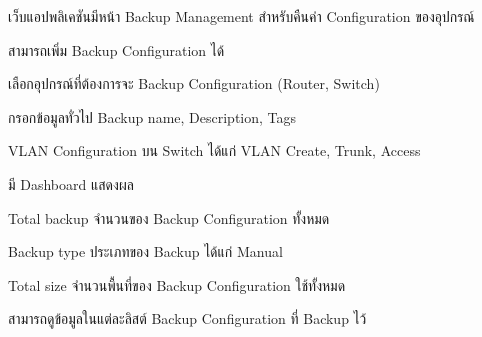 \begin{mycustomenum2}
    \item เว็บแอปพลิเคชันมีหน้า Backup Management สำหรับคืนค่า Configuration ของอุปกรณ์
    \begin{mycustomenum2}
        \item สามารถเพิ่ม Backup Configuration ได้
            \begin{mycustomenum2}
                \item เลือกอุปกรณ์ที่ต้องการจะ Backup Configuration (Router, Switch)
                \item กรอกข้อมูลทั่วไป Backup name, Description, Tags
                \item VLAN Configuration บน Switch ได้แก่ VLAN Create, Trunk, Access 
            \end{mycustomenum2} 
        \item มี Dashboard แสดงผล
            \begin{mycustomenum2}
                \item Total backup จำนวนของ Backup Configuration ทั้งหมด
                \item Backup type ประเภทของ Backup ได้แก่ Manual
                \item Total size จำนวนพื้นที่ของ Backup Configuration ใช้ทั้งหมด
            \end{mycustomenum2} 
        \item สามารถดูข้อมูลในแต่ละลิสต์ Backup Configuration ที่ Backup ไว้ 
    \end{mycustomenum2}
    
\end{mycustomenum2}


